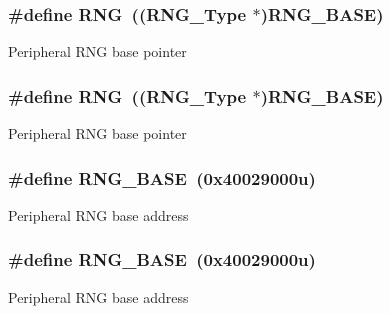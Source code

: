 \subsubsection[{\texorpdfstring{R\+NG}{RNG}}]{\setlength{\rightskip}{0pt plus 5cm}\#define R\+NG~(({\bf R\+N\+G\+\_\+\+Type} $\ast$){\bf R\+N\+G\+\_\+\+B\+A\+SE})}\hypertarget{group__RNG__Peripheral__Access__Layer_ga5b0885b8b55bbc13691092b704d9309f}{}\label{group__RNG__Peripheral__Access__Layer_ga5b0885b8b55bbc13691092b704d9309f}
Peripheral R\+NG base pointer 
\subsubsection[{\texorpdfstring{R\+NG}{RNG}}]{\setlength{\rightskip}{0pt plus 5cm}\#define R\+NG~(({\bf R\+N\+G\+\_\+\+Type} $\ast$){\bf R\+N\+G\+\_\+\+B\+A\+SE})}\hypertarget{group__RNG__Peripheral__Access__Layer_ga5b0885b8b55bbc13691092b704d9309f}{}\label{group__RNG__Peripheral__Access__Layer_ga5b0885b8b55bbc13691092b704d9309f}
Peripheral R\+NG base pointer 
\subsubsection[{\texorpdfstring{R\+N\+G\+\_\+\+B\+A\+SE}{RNG_BASE}}]{\setlength{\rightskip}{0pt plus 5cm}\#define R\+N\+G\+\_\+\+B\+A\+SE~(0x40029000u)}\hypertarget{group__RNG__Peripheral__Access__Layer_gab92662976cfe62457141e5b4f83d541c}{}\label{group__RNG__Peripheral__Access__Layer_gab92662976cfe62457141e5b4f83d541c}
Peripheral R\+NG base address 
\subsubsection[{\texorpdfstring{R\+N\+G\+\_\+\+B\+A\+SE}{RNG_BASE}}]{\setlength{\rightskip}{0pt plus 5cm}\#define R\+N\+G\+\_\+\+B\+A\+SE~(0x40029000u)}\hypertarget{group__RNG__Peripheral__Access__Layer_gab92662976cfe62457141e5b4f83d541c}{}\label{group__RNG__Peripheral__Access__Layer_gab92662976cfe62457141e5b4f83d541c}
Peripheral R\+NG base address 
